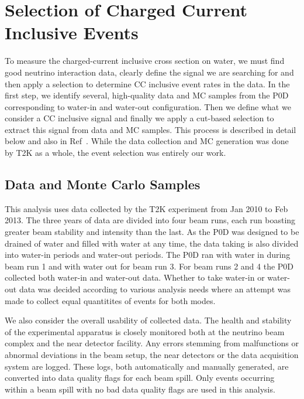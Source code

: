 \section{Selection of Charged Current Inclusive Events}
\label{sec:selectionheader}

To measure the charged-current inclusive cross section on water, we must find good neutrino interaction data, clearly define the signal we are searching for and then apply a selection to determine CC inclusive event rates in the data. In the first step, we identify several, high-quality data and MC samples from the P0D corresponding to water-in and water-out configuration. Then we define what we consider a CC inclusive signal and finally we apply a cut-based selection to extract this signal from data and MC samples. This process is described in detail below and also in Ref~\cite{tn80}. While the data collection and MC generation was done by T2K as a whole, the event selection was entirely our work.

\subsection{Data and Monte Carlo Samples}
\label{sec:Samples}

This analysis uses data collected by the T2K experiment from Jan 2010 to Feb 2013. The three years of data are divided into four beam runs, each run boasting greater beam stability and intensity than the last. As the P0D was designed to be drained of water and filled with water at any time, the data taking is also divided into water-in periods and water-out periods. The P0D ran with water in during beam run 1 and with water out for beam run 3. For beam runs 2 and 4 the P0D collected both water-in and water-out data. Whether to take water-in or water-out data was decided according to various analysis needs where an attempt was made to collect equal quantitites of events for both modes.

We also consider the overall usability of collected data. The health and stability of the experimental apparatus is closely monitored both at the neutrino beam complex and the near detector facility. Any errors stemming from malfunctions or abnormal deviations in the beam setup, the near detectors or the data acquisition system are logged. These logs, both automatically and manually generated, are converted into data quality flags for each beam spill. Only events occurring within a beam spill with no bad data quality flags are used in this analysis.


